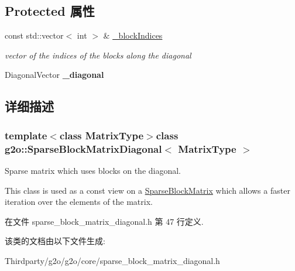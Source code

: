\subsection*{Protected 属性}
\begin{DoxyCompactItemize}
\item 
\hypertarget{classg2o_1_1SparseBlockMatrixDiagonal_a12ca3362997c3ca21c8b2a203177485e}{const std\-::vector$<$ int $>$ \& \hyperlink{classg2o_1_1SparseBlockMatrixDiagonal_a12ca3362997c3ca21c8b2a203177485e}{\-\_\-block\-Indices}}\label{classg2o_1_1SparseBlockMatrixDiagonal_a12ca3362997c3ca21c8b2a203177485e}

\begin{DoxyCompactList}\small\item\em vector of the indices of the blocks along the diagonal \end{DoxyCompactList}\item 
\hypertarget{classg2o_1_1SparseBlockMatrixDiagonal_a0679df785f9e7b79a1e9dfe623af5341}{Diagonal\-Vector {\bfseries \-\_\-diagonal}}\label{classg2o_1_1SparseBlockMatrixDiagonal_a0679df785f9e7b79a1e9dfe623af5341}

\end{DoxyCompactItemize}


\subsection{详细描述}
\subsubsection*{template$<$class Matrix\-Type$>$class g2o\-::\-Sparse\-Block\-Matrix\-Diagonal$<$ Matrix\-Type $>$}

Sparse matrix which uses blocks on the diagonal. 

This class is used as a const view on a \hyperlink{classg2o_1_1SparseBlockMatrix}{Sparse\-Block\-Matrix} which allows a faster iteration over the elements of the matrix. 

在文件 sparse\-\_\-block\-\_\-matrix\-\_\-diagonal.\-h 第 47 行定义.



该类的文档由以下文件生成\-:\begin{DoxyCompactItemize}
\item 
Thirdparty/g2o/g2o/core/sparse\-\_\-block\-\_\-matrix\-\_\-diagonal.\-h\end{DoxyCompactItemize}
